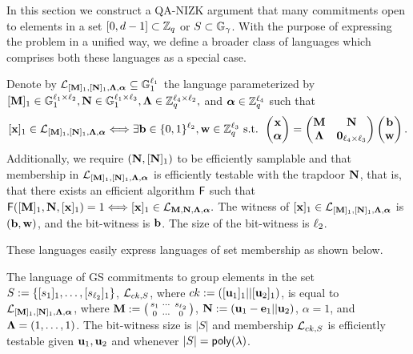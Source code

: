 
In this section we construct a QA-NIZK argument that many commitments open to elements in a set $[0,d-1] \subset \mathbb{Z}_q$ or  $S \subset \mathbb{G}_{\gamma}$. With the purpose of expressing the problem in a unified way, 
we define a broader class of languages which comprises both these languages as a special case. 


\begin{definition}
Denote by $\mathcal{L}_{[\mathbf{{M}}]_1,[\mathbf{{N}}]_1,\mathbf{{\Lambda}},{\boldsymbol \alpha}}\subseteq\mathbb{G}_1^{\ell_1}$ the language parameterized by $[\mathbf{{M}}]_1 \in\mathbb{G}_1^{{\ell_1}\times {\ell_2}},\mathbf{{N}}\in\mathbb{G}_1^{{\ell_1}\times {\ell_3}},\mathbf{{\Lambda}}\in\mathbb{Z}_q^{{\ell_4}\times{\ell_2}},$ and ${\boldsymbol \alpha}\in\mathbb{Z}_q^{\ell_4}$ such that
\begin{equation}\label{eq:definition1}
[\mathbf{x}]_1\in\mathcal{L}_{[\mathbf{{M}}]_1,[\mathbf{{N}}]_1,\mathbf{{\Lambda}},{\boldsymbol \alpha}} \Longleftrightarrow \exists \mathbf{b}\in\{0,1\}^{\ell_2},\mathbf{w}\in\mathbb{Z}_q^{\ell_3} \text{ s.t. }
\left(\begin{matrix}
    \mathbf{x}\\
    {\boldsymbol \alpha}
\end{matrix}\right)
=
\begin{pmatrix}
    \mathbf{{M}}       & \mathbf{{N}}\\
    \mathbf{{\Lambda}} & \mathbf{{0}}_{{\ell_4}\times {\ell_3}}
\end{pmatrix}
\left(\begin{matrix}
    \mathbf{b}\\
    \mathbf{w}
\end{matrix}\right).
\end{equation}
Additionally, we require $(\mathbf{{N}},[\mathbf{{N}}]_1)$ to be efficiently samplable and that membership in $\mathcal{L}_{[\mathbf{{M}}]_1,[\mathbf{{N}}]_1,\mathbf{{\Lambda}},{\boldsymbol \alpha}}$ is efficiently testable with the trapdoor $\mathbf{{N}}$, that is, that there exists an efficient algorithm $\mathsf{F}$ such that $\mathsf{F}([\mathbf{{M}}]_1,\mathbf{{N}},[\mathbf{x}]_1)=1\Longleftrightarrow [\mathbf{x}]_1\in\mathcal{L}_{\mathbf{{M}},\mathbf{{N}},\mathbf{{\Lambda}},{\boldsymbol \alpha}}.$ The witness of 
$[\mathbf{x}]_1\in\mathcal{L}_{[\mathbf{{M}}]_1,[\mathbf{{N}}]_1,\mathbf{{\Lambda}},{\boldsymbol \alpha}}$ is $(\mathbf{b},\mathbf{w})$, and the bit-witness is $\mathbf{b}$. The size of the bit-witness is ${\ell_2}$. 
\end{definition}

These languages easily express languages of set membership as shown below.


\begin{example}
The language of GS commitments to group elements in the set $S:=\{[s_1]_1,\ldots,[s_{\ell_2}]_1\}$, $\mathcal{L}_{ck,S}$, where $ck:=([\mathbf{u}_1]_1||[\mathbf{u}_2]_1)$, is equal to $\mathcal{L}_{[\mathbf{{M}}]_1,[\mathbf{{N}}]_1,\mathbf{{\Lambda}},{\boldsymbol \alpha}}$, where
$\mathbf{{M}}:=\left(\begin{smallmatrix}s_1 & \cdots & s_{\ell_2} \\ 0 &\cdots & 0\end{smallmatrix}\right)$, $\mathbf{{N}}:=(\mathbf{u}_1-\mathbf{e}_1||\mathbf{u}_2)$, $\alpha=1$, and $\mathbf{{\Lambda}}=(1,\ldots,1)$. The bit-witness size is $|S|$ and membership $\mathcal{L}_{ck,S}$ is efficiently testable given $\mathbf{u}_1,\mathbf{u}_2$ and whenever $|S|=\mathsf{poly}(\lambda)$. 
\end{example}

